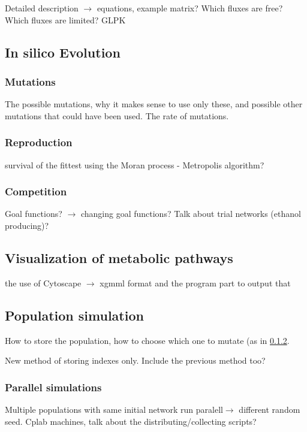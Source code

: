 \documentclass[]{article}
\begin{document}
Detailed description $\rightarrow$ equations, example matrix? Which fluxes are free? Which fluxes are limited? GLPK 


\subsection{In silico Evolution}
\label{sub:Implementing evolution}
\subsubsection{Mutations}
\label{ssub:Mutations}
The possible mutations, why it makes sense to use only these, and possible other mutations that could have been used. The rate of mutations. 
\subsubsection{Reproduction}
\label{ssub:Reproduction}
survival of the fittest using the Moran process - Metropolis algorithm?

\subsubsection{Competition}
\label{ssub:Competition}
Goal functions? $\rightarrow$ changing goal functions? Talk about trial networks (ethanol producing)?

\subsection{Visualization of metabolic pathways}
\label{sub:visualization}

the use of Cytoscape $\rightarrow$ xgmml format and the  program part to output that

\subsection{Population simulation}
\label{sub:population_simulation}
How to store the population, how to choose which one to mutate (as in \ref{ssub:Reproduction}. 

New method of storing indexes only. Include the previous method too?

\subsubsection{Parallel simulations}
\label{ssub:Paralell simulations}
Multiple populations with same initial network  run paralell$\rightarrow$ different random seed. Cplab machines, talk about the distributing/collecting scripts?
\end{document}
